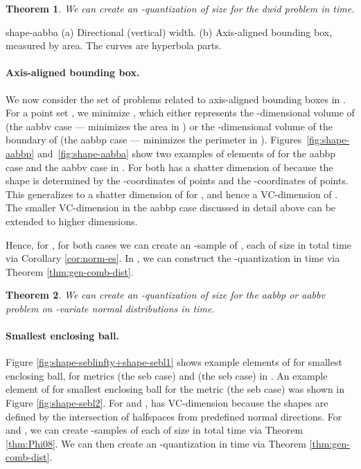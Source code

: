 \documentclass{journal}
\newtheorem {theorem}{Theorem}[section]
\begin{document}
\begin{theorem}
We can create an -quantization of size  for the \textsf{dwid} problem in  time.
\end{theorem}

 {shape-aabba}
{(a) Directional (vertical) width. (b) Axis-aligned bounding box, measured by area. The curves are hyperbola parts.}


\paragraph{Axis-aligned bounding box.}
We now consider the set of problems related to axis-aligned bounding boxes in .  For a point set , we minimize , which either represents the -dimensional volume of  (the \textsf{aabbv} case --- minimizes the area in ) or the -dimensional volume of the boundary of  (the \textsf{aabbp} case --- minimizes the perimeter in ).
      Figures~\ref{fig:shape-aabbp} and~\ref {fig:shape-aabba} show two examples of elements of  for the \textsf{aabbp} case and the \textsf{aabbv} case in .  For both  has a shatter dimension of  because the shape is determined by the -coordinates of  points and the -coordinates of  points.  This generalizes to a shatter dimension of  for , and hence a VC-dimension of .  The smaller VC-dimension in the \textsf{aabbp} case discussed in detail above can be extended to higher dimensions.



Hence, for ,  for both cases we can create an -sample  of , each of size  in total time  via Corollary \ref{cor:norm-es}.
In , we can construct the -quantization in
 time via Theorem \ref{thm:gen-comb-dist}.

\begin{theorem}
We can create an -quantization of size  for the \textsf{aabbp} or \textsf{aabbv} problem on  -variate normal distributions in  time.
\end{theorem}


\paragraph{Smallest enclosing ball.}
Figure \ref{fig:shape-seblinfty+shape-sebl1} shows example elements of  for smallest enclosing ball, for metrics  (the \textsf{seb} case) and  (the \textsf{seb} case) in .  An example element of  for smallest enclosing ball for the  metric (the \textsf{seb} case) was shown in Figure \ref{fig:shape-sebl2}.  For  and ,  has VC-dimension  because the shapes are defined by the intersection of halfspaces from  predefined normal directions.
For  and , we can create  -samples  of each  of size  in total time  via Theorem \ref{thm:Phi08}.
We can then create an -quantization in  time via Theorem \ref{thm:gen-comb-dist}.
\end{document}

